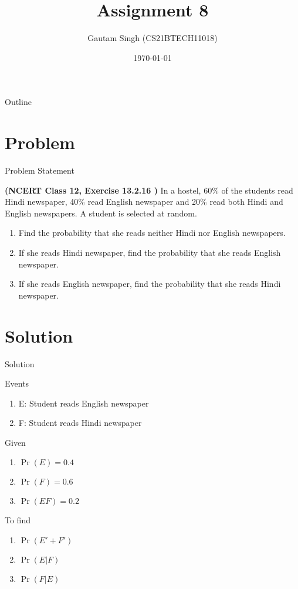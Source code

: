 \documentclass{beamer}
\title{Assignment 8}
\author{Gautam Singh (CS21BTECH11018)}
\date{\today}
\providecommand{\pr}[1]{\ensuremath{\Pr\left(#1\right)}}
\begin{document}
\begin{frame}
    \titlepage 
\end{frame}

\begin{frame}{Outline}
    \tableofcontents
\end{frame}


\section{Problem}
\begin{frame}{Problem Statement}

\textbf{(NCERT Class 12, Exercise 13.2.16 )} In a hostel, 60\% of the students read Hindi newspaper, 40\% read English newspaper and 20\% read both Hindi and English newspapers. A student is selected at random.

\begin{enumerate}[label=(\alph{enumi})]
	\item Find the probability that she reads neither Hindi nor English newspapers.
	\item If she reads Hindi newspaper, find the probability that she reads English newspaper.
	\item If she reads English newspaper, find the probability that she reads Hindi newspaper.
\end{enumerate}

\end{frame}


\section{Solution}
\begin{frame}{Solution}
    \begin{block}{Events}
        \begin{enumerate}
        		\item E: Student reads English newspaper
        		\item F: Student reads Hindi newspaper
        \end{enumerate}
    \end{block}
    \begin{block}{Given}
		\begin{enumerate}
			\item $\pr{E} = 0.4$
			\item $\pr{F} = 0.6$
			\item $\pr{EF} = 0.2$
			\label{given}	
		\end{enumerate}		    
    \end{block}
    \begin{alertblock}{To find}
    		\begin{enumerate}
    			\item $\pr{E' + F'}$
    			\item $\pr{E|F}$
    			\item $\pr{F|E}$
    		\end{enumerate}
    \end{alertblock}
\end{frame} 
\end{document}
